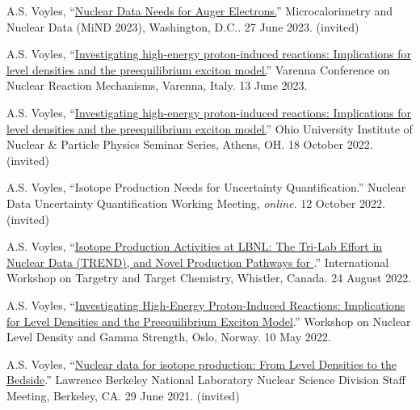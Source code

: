 \begin{bibsection}
\item A.S. Voyles, \enquote{\href{https://conferences.lbl.gov/event/1243/contributions/7398/}{Nuclear Data Needs for Auger
Electrons.}} Microcalorimetry and Nuclear Data (MiND 2023), Washington, D.C.. 27 June 2023. (invited)

\item A.S. Voyles, \enquote{\href{https://indico.cern.ch/event/1132769/contributions/5395295/}{Investigating high-energy proton-induced reactions: Implications for level densities and the preequilibrium exciton model.}}  Varenna Conference on Nuclear Reaction Mechanisms, Varenna, Italy. 13 June 2023. 

\item A.S. Voyles, \enquote{\href{https://inpp.ohio.edu/~inpp/seminars/abstracts_fall2022/INPP_18Oct22.pdf}{Investigating high-energy proton-induced reactions: Implications for level densities and the preequilibrium exciton model.}} Ohio University Institute of Nuclear \& Particle Physics Seminar Series, Athens, OH. 18 October 2022. (invited)

\item A.S. Voyles, \enquote{Isotope Production Needs for Uncertainty Quantification.} Nuclear Data Uncertainty Quantification Working Meeting, \emph{online}. 12 October 2022. (invited)

\item A.S. Voyles, \enquote{\href{https://meetings.triumf.ca/event/108/contributions/3718/}{Isotope Production Activities at LBNL: The Tri-Lab Effort in Nuclear Data (TREND), and Novel Production Pathways for }.}  International Workshop on Targetry and Target Chemistry, Whistler, Canada. 24 August 2022.

\item A.S. Voyles, \enquote{\href{https://www.mn.uio.no/fysikk/english/research/news-and-events/events/conferences/gamma8/program/book_of_abstracts.pdf}{Investigating High-Energy Proton-Induced Reactions: Implications for Level Densities and the Preequilibrium Exciton Model}.}   Workshop on Nuclear Level Density and Gamma Strength, Oslo, Norway. 10 May 2022.

\item A.S. Voyles, \enquote{\href{https://conferences.lbl.gov/event/541/}{Nuclear data for isotope production: From Level Densities to the Bedside}.} Lawrence Berkeley National Laboratory Nuclear Science Division Staff Meeting, Berkeley, CA. 29 June 2021. (invited)




\end{bibsection}

